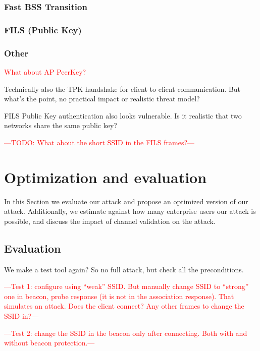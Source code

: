 \documentclass[sigconf,review]{acmart}
\DeclareRobustCommand{\red}[1]{\textcolor{red}{#1}}
\begin{document}
\subsubsection{Fast BSS Transition}

\subsubsection{FILS (Public Key)}

\subsubsection{Other}

\red{What about AP PeerKey?}

Technically also the TPK handshake for client to client communication.
But what's the point, no practical impact or realistic threat model?

FILS Public Key authentication also looks vulnerable.
Is it realistic that two networks share the same public key?

\red{---TODO: What about the short SSID in the FILS frames?---}

\section{Optimization and evaluation}
\label{sec:evaluation}

In this Section we evaluate our attack and propose an optimized version of our attack.
Additionally, we estimate against how many enterprise users our attack is possible, and discuss the impact of channel validation on the attack.

\subsection{Evaluation}

We make a test tool again? So no full attack, but check all the preconditions.



\red{---Test 1: configure using ``weak'' SSID. But manually change SSID to ``strong'' one in beacon, probe response (it is not in the association response). That simulates an attack. Does the client connect? Any other frames to change the SSID in?---}

\red{---Test 2: change the SSID in the beacon only after connecting. Both with and without beacon protection.---}
\end{document}
